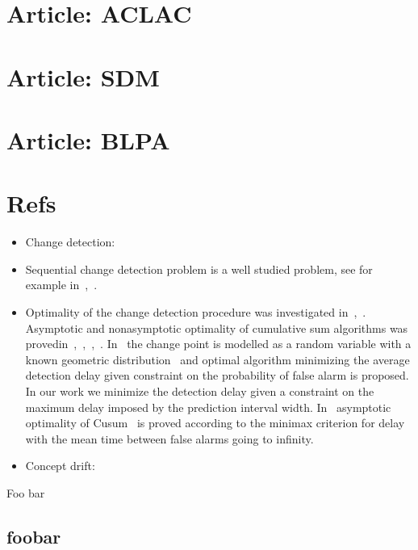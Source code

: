\documentclass[doctoral,utf8,lot,loar,lof,shortloft,index]{jydiss}
\begin{document}
\chapter{Article: ACLAC}



\chapter{Article: SDM}
%

\chapter{Article: BLPA}



\chapter{Refs}
\begin{itemize}
  \item Change detection:~\cite{basseville1993detection}
  \item Sequential change detection problem is a well studied problem, see for example in~\cite{tartakovsky2014sequential},~\cite{plasse2021streaming}.

  \item Optimality of the change detection procedure was investigated in~\cite{Page1954},~\cite{Shiryaev2010,Shiryaev1961,Shiryaev1963}.
  Asymptotic and nonasymptotic optimality of cumulative sum algorithms was provedin~\cite{lorden1971procedures},~\cite{moustakides1986optimal},~\cite{moustakides2004optimality},~\cite{ritov1990decision}. In~\cite{Shiryaev1963,shiryaev2007optimal} the change point is modelled as a random variable with a known geometric distribution~\cite{veeravalli2014quickest} and optimal algorithm minimizing the average detection delay given constraint on the probability of false alarm is proposed. In our work we minimize the detection delay given a constraint on the maximum delay imposed by the prediction interval width. In~\cite{lorden1971procedures} asymptotic optimality of Cusum~\cite{Page1954} is proved according to the minimax criterion for delay with the mean time between false alarms going to infinity.

  \item Concept drift:
\end{itemize}

\tailmatter
\finnishsummary
Foo bar




%

\appendices
{}
\section{foobar}

\backmatter


\printindex
\end{document}
